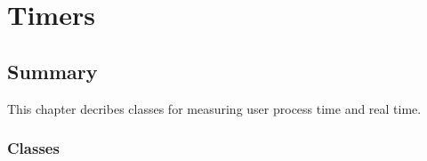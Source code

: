 
\ccParDims

\clearpage
\chapter{Timers}

\section*{Summary}

This chapter decribes classes for measuring user process time and real time.

\subsection*{Classes}
\\
\\
